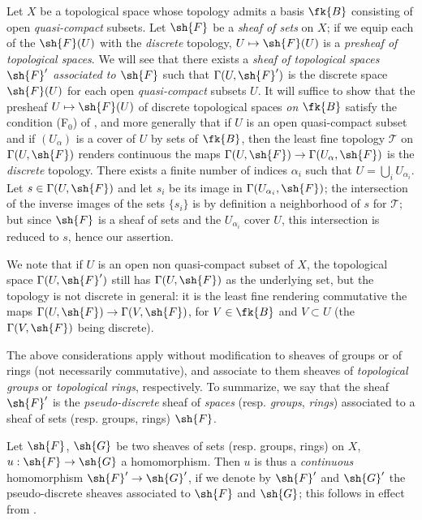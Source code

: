 \begin{env}[3.8.1]
\label{0.3.8.1}
Let $X$ be a topological space whose topology admits a basis $\fk{B}$
consisting of open \emph{quasi-compact} subsets. Let $\sh{F}$ be a \emph{sheaf
of sets} on $X$; if we equip each of the $\sh{F}(U)$ with the \emph{discrete}
topology, $U\mapsto\sh{F}(U)$ is a \emph{presheaf of topological spaces}. We
will see that there exists a \emph{sheaf of topological spaces $\sh{F}'$
associated to $\sh{F}$}  such that $\Gamma(U,\sh{F}')$ is the
discrete space $\sh{F}(U)$ for each open \emph{quasi-compact} subsets $U$. It
will suffice to show that the presheaf $U\mapsto\sh{F}(U)$ of discrete
topological spaces \emph{on $\fk{B}$} satisfy the condition (F$_0$) of
, and more generally that if $U$ is an open quasi-compact
subset and if $(U_\alpha)$ is a cover of $U$ by sets of $\fk{B}$, then the
least fine topology $\mathcal{T}$ on $\Gamma(U,\sh{F})$ renders continuous the
maps $\Gamma(U,\sh{F})\to\Gamma(U_\alpha,\sh{F})$ is the \emph{discrete}
topology. There exists a finite number of indices $\alpha_i$ such that
$U=\bigcup_i U_{\alpha_i}$. Let $s\in\Gamma(U,\sh{F})$ and let $s_i$ be its
image in $\Gamma(U_{\alpha_i},\sh{F})$; the intersection of the inverse images
of the sets $\{s_i\}$ is by definition a neighborhood of $s$ for $\mathcal{T}$;
but since $\sh{F}$ is a sheaf of sets and the $U_{\alpha_i}$ cover $U$, this
intersection is reduced to $s$, hence our assertion.

We note that if $U$ is an open non quasi-compact subset of $X$, the topological
space $\Gamma(U,\sh{F}')$ still has $\Gamma(U,\sh{F})$ as the underlying set,
but the topology is not discrete in general: it is the least fine rendering
commutative the maps $\Gamma(U,\sh{F})\to\Gamma(V,\sh{F})$, for
$V\in\fk{B}$ and $V\subset U$ (the $\Gamma(V,\sh{F})$ being discrete).

The above considerations apply without modification to sheaves of groups or of
rings (not necessarily commutative), and associate to them sheaves of
\emph{topological groups} or \emph{topological rings}, respectively. To
summarize, we say that the sheaf $\sh{F}'$ is the \emph{pseudo-discrete} sheaf
of \emph{spaces} (resp. \emph{groups}, \emph{rings}) associated to a sheaf of
sets (resp. groups, rings) $\sh{F}$.
\end{env}

\begin{env}[3.8.2]
\label{0.3.8.2}
Let $\sh{F}$, $\sh{G}$ be two sheaves of sets (resp. groups, rings) on $X$,
$u:\sh{F}\to\sh{G}$ a homomorphism. Then $u$ is thus a \emph{continuous}
homomorphism $\sh{F}'\to\sh{G}'$, if we denote by $\sh{F}'$ and $\sh{G}'$ the
pseudo-discrete sheaves associated to $\sh{F}$ and $\sh{G}$; this follows in
effect from .
\end{env}


